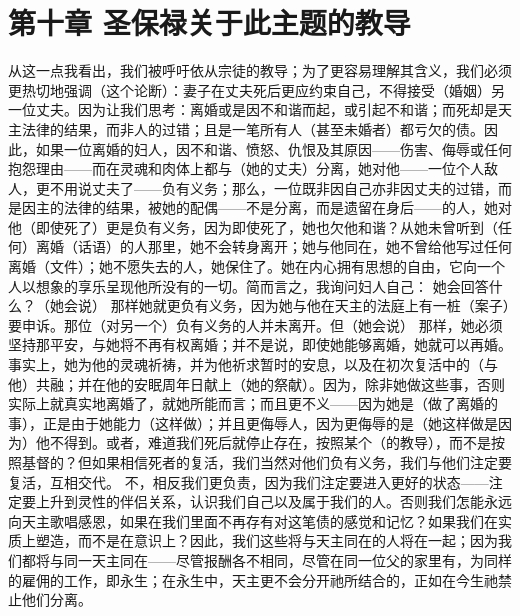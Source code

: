 
\section{第十章 圣保禄关于此主题的教导}

从这一点我看出，我们被呼吁依从宗徒的教导；为了更容易理解其含义，我们必须更热切地强调（这个论断）：妻子在丈夫死后更应约束自己，不得接受（婚姻）另一位丈夫。因为让我们思考：离婚或是因不和谐而起，或引起不和谐；而死却是天主法律的结果，而非人的过错；且是一笔所有人（甚至未婚者）都亏欠的债。因此，如果一位离婚的妇人，因不和谐、愤怒、仇恨及其原因——伤害、侮辱或任何抱怨理由——而在灵魂和肉体上都与（她的丈夫）分离，她对他——一位个人敌人，更不用说丈夫了——负有义务；那么，一位既非因自己亦非因丈夫的过错，而是因主的法律的结果，被她的配偶——不是分离，而是遗留在身后——的人，她对他（即使死了）更是负有义务，因为即使死了，她也欠他和谐？从她未曾听到（任何）离婚（话语）的人那里，她不会转身离开；她与他同在，她不曾给他写过任何离婚（文件）；她不愿失去的人，她保住了。她在内心拥有思想的自由，它向一个人以想象的享乐呈现他所没有的一切。简而言之，我询问妇人自己： 她会回答什么？（她会说） 那样她就更负有义务，因为她与他在天主的法庭上有一桩（案子）要申诉。那位（对另一个）负有义务的人并未离开。但（她会说） 那样，她必须坚持那平安，与她将不再有权离婚；并不是说，即使她能够离婚，她就可以再婚。事实上，她为他的灵魂祈祷，并为他祈求暂时的安息，以及在初次复活中的（与他）共融；并在他的安眠周年日献上（她的祭献）。因为，除非她做这些事，否则实际上就真实地离婚了，就她所能而言；而且更不义——因为她是（做了离婚的事），正是由于她能力（这样做）；并且更侮辱人，因为更侮辱的是（她这样做是因为）他不得到。或者，难道我们死后就停止存在，按照某个（的教导），而不是按照基督的？但如果相信死者的复活，我们当然对他们负有义务，我们与他们注定要复活，互相交代。 不，相反我们更负责，因为我们注定要进入更好的状态——注定要上升到灵性的伴侣关系，认识我们自己以及属于我们的人。否则我们怎能永远向天主歌唱感恩，如果在我们里面不再存有对这笔债的感觉和记忆？如果我们在实质上塑造，而不是在意识上？因此，我们这些将与天主同在的人将在一起；因为我们都将与同一天主同在——尽管报酬各不相同，尽管在同一位父的家里有，为同样的雇佣的工作，即永生；在永生中，天主更不会分开祂所结合的，正如在今生祂禁止他们分离。\par

